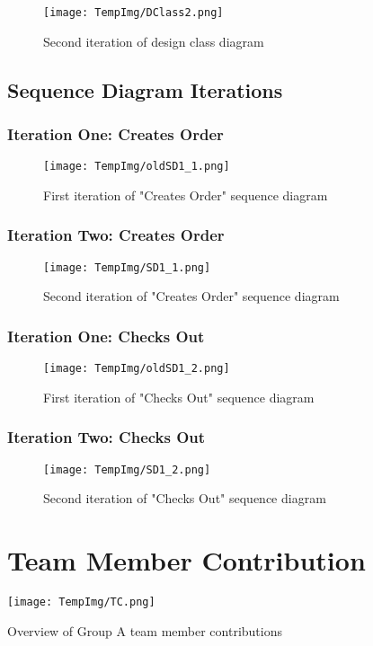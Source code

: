\documentclass[fontsize=11pt]{extarticle}
\numberwithin{figure}{section} %
\numberwithin{table}{section}%
\begin{document}
\begin{figure}[H]
      \centering
      \texttt{[image: TempImg/DClass2.png]}
      \caption{Second iteration of design class diagram}
\end{figure}


\subsection{Sequence Diagram Iterations}


\subsubsection{Iteration One: Creates Order}

\begin{figure}[H]
      \centering
      \texttt{[image: TempImg/oldSD1\_1.png]}
      \caption{First iteration of "Creates Order" sequence diagram}
\end{figure}

\subsubsection{Iteration Two: Creates Order}

\begin{figure}[H]
      \centering
      \texttt{[image: TempImg/SD1\_1.png]}
      \caption{Second iteration of "Creates Order" sequence diagram}
\end{figure}

\subsubsection{Iteration One: Checks Out}

\begin{figure}[H]
      \centering
      \texttt{[image: TempImg/oldSD1\_2.png]}
      \caption{First iteration of "Checks Out" sequence diagram}
\end{figure}

\subsubsection{Iteration Two: Checks Out}

\begin{figure}[H]
      \centering
      \texttt{[image: TempImg/SD1\_2.png]}
      \caption{Second iteration of "Checks Out" sequence diagram}
\end{figure}

\newpage
\section{Team Member Contribution}

\begin{table}[H]
      \centering
      \texttt{[image: TempImg/TC.png]}
      \caption{Overview of Group A team member contributions}
\end{table}
\end{document}
